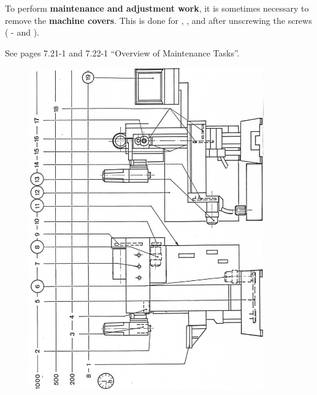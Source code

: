To perform \textbf{maintenance and adjustment work}, it is sometimes necessary to remove the \textbf{machine covers}.  
This is done for , , and  after unscrewing the screws ( -  and ).



\setcounter{section}{20}

See pages 7.21-1 and 7.22-1 \enquote{Overview of Maintenance Tasks}.

\begin{figure}[H]
    \centering
    \includegraphics[width=0.9\textwidth]{images/chapter7/maintenance_plan_diagram.jpg}
    \label{fig:maintenance_plan}
\end{figure}

